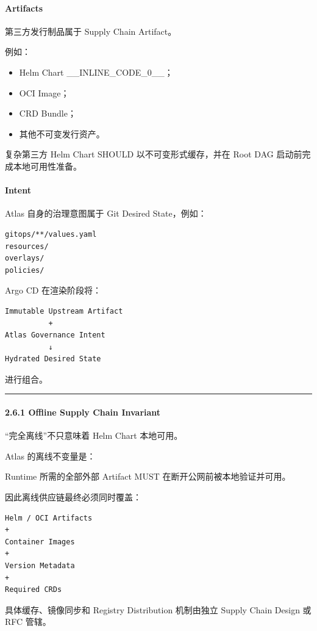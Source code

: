\documentclass[11pt,a4paper]{article}
\begin{document}
\paragraph{Artifacts}
第三方发行制品属于 Supply Chain Artifact。

例如：

\begin{itemize}
  \item Helm Chart \_\_INLINE\_CODE\_0\_\_；
  \item OCI Image；
  \item CRD Bundle；
  \item 其他不可变发行资产。
\end{itemize}
复杂第三方 Helm Chart SHOULD 以不可变形式缓存，并在 Root DAG 启动前完成本地可用性准备。

\paragraph{Intent}
Atlas 自身的治理意图属于 Git Desired State，例如：

\begin{lstlisting}[language=text]
gitops/**/values.yaml
resources/
overlays/
policies/
\end{lstlisting}
Argo CD 在渲染阶段将：

\begin{lstlisting}[language=text]
Immutable Upstream Artifact
          +
Atlas Governance Intent
          ↓
Hydrated Desired State
\end{lstlisting}
进行组合。

\vspace{0.5em}\hrule\vspace{0.5em}
\paragraph{2.6.1 Offline Supply Chain Invariant}
“完全离线”不只意味着 Helm Chart 本地可用。

Atlas 的离线不变量是：

\begin{gfmBlockquote}
Runtime 所需的全部外部 Artifact MUST 在断开公网前被本地验证并可用。
\end{gfmBlockquote}
因此离线供应链最终必须同时覆盖：

\begin{lstlisting}[language=text]
Helm / OCI Artifacts
+
Container Images
+
Version Metadata
+
Required CRDs
\end{lstlisting}
具体缓存、镜像同步和 Registry Distribution 机制由独立 Supply Chain Design 或 RFC 管辖。
\end{document}
